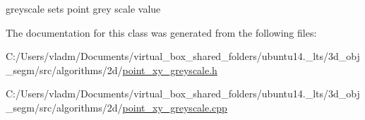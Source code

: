 greyscale sets point grey scale value 



The documentation for this class was generated from the following files\+:\begin{DoxyCompactItemize}
\item 
C\+:/\+Users/vladm/\+Documents/virtual\+\_\+box\+\_\+shared\+\_\+folders/ubuntu14.\+\_\+lts/3d\+\_\+obj\+\_\+segm/src/algorithms/2d/\hyperlink{point__xy__greyscale_8h}{point\+\_\+xy\+\_\+greyscale.\+h}\item 
C\+:/\+Users/vladm/\+Documents/virtual\+\_\+box\+\_\+shared\+\_\+folders/ubuntu14.\+\_\+lts/3d\+\_\+obj\+\_\+segm/src/algorithms/2d/\hyperlink{point__xy__greyscale_8cpp}{point\+\_\+xy\+\_\+greyscale.\+cpp}\end{DoxyCompactItemize}
